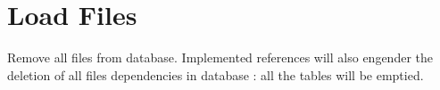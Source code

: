 \documentclass[letterpaper,10pt,english]{sphinxmanual}
\begin{document}
\section{Load Files}
\label{\detokenize{load:module-loacore.load.file_load}}\label{\detokenize{load:load-files}}

\begin{fulllineitems}
\label{\detokenize{load:loacore.load.file_load.clean_db}}
Remove all files from database. Implemented references will also engender the deletion of all files
dependencies in database : all the tables will be emptied.

\end{fulllineitems}

\end{document}
